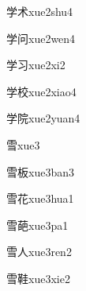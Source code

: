 \begin{verbete}[8;5]{学术}{xue2shu4}
\end{verbete}

\begin{verbete}[8;6]{学问}{xue2wen4}
\end{verbete}

\begin{verbete}[8;3]{学习}{xue2xi2}
\end{verbete}

\begin{verbete}[8;10]{学校}{xue2xiao4}
\end{verbete}

\begin{verbete}[8;9]{学院}{xue2yuan4}
\end{verbete}

\begin{verbete}[11]{雪}{xue3}
\end{verbete}

\begin{verbete}[11;8]{雪板}{xue3ban3}
\end{verbete}

\begin{verbete}[11;7]{雪花}{xue3hua1}
\end{verbete}

\begin{verbete}[11;12]{雪葩}{xue3pa1}
\end{verbete}

\begin{verbete}[11;2]{雪人}{xue3ren2}
\end{verbete}

\begin{verbete}[11;15]{雪鞋}{xue3xie2}
\end{verbete}


